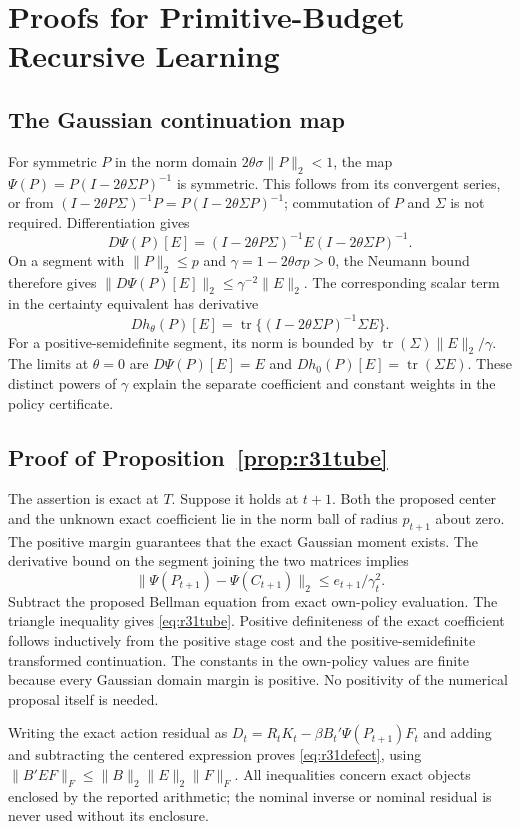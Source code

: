 \section{Proofs for Primitive-Budget Recursive Learning}\label{sec:r31proofs}
\subsection{The Gaussian continuation map}
For symmetric $P$ in the norm domain $2\theta\sigma\|P\|_2<1$, the map
$\Psi(P)=P(I-2\theta\Sigma P)^{-1}$ is symmetric. This follows from its
convergent series, or from
$(I-2\theta P\Sigma)^{-1}P=P(I-2\theta\Sigma P)^{-1}$;
commutation of $P$ and $\Sigma$ is not required. Differentiation gives
\[
 D\Psi(P)[E]=(I-2\theta P\Sigma)^{-1}
               E(I-2\theta\Sigma P)^{-1}.
\]
On a segment with $\|P\|_2\leq p$ and
$\gamma=1-2\theta\sigma p>0$, the Neumann bound therefore gives
$\|D\Psi(P)[E]\|_2\leq\gamma^{-2}\|E\|_2$.
The corresponding scalar term in the certainty equivalent has derivative
\[
 Dh_\theta(P)[E]=\operatorname{tr}
       \{(I-2\theta\Sigma P)^{-1}\Sigma E\}.
\]
For a positive-semidefinite segment, its norm is bounded by
$\operatorname{tr}(\Sigma)\|E\|_2/\gamma$. The limits at $\theta=0$ are
$D\Psi(P)[E]=E$ and $Dh_0(P)[E]=\operatorname{tr}(\Sigma E)$.
These distinct powers of $\gamma$ explain the separate coefficient and
constant weights in the policy certificate.

\subsection{Proof of Proposition~\ref{prop:r31tube}}
The assertion is exact at $T$. Suppose it holds at $t+1$. Both the proposed
center and the unknown exact coefficient lie in the norm ball of radius
$p_{t+1}$ about zero. The positive margin guarantees that the exact Gaussian
moment exists. The derivative bound on the segment joining the two matrices
implies
\[
 \|\Psi(P_{t+1})-\Psi(C_{t+1})\|_2
                         \leq e_{t+1}/\gamma_t^2.
\]
Subtract the proposed Bellman equation from exact own-policy evaluation.
The triangle inequality gives \eqref{eq:r31tube}. Positive definiteness of
the exact coefficient follows inductively from the positive stage cost and
the positive-semidefinite transformed continuation. The constants in the
own-policy values are finite because every Gaussian domain margin is
positive. No positivity of the numerical proposal itself is needed.

Writing the exact action residual as
$D_t=R_tK_t-\beta B_t'\Psi(P_{t+1})F_t$ and adding and subtracting the
centered expression proves \eqref{eq:r31defect}, using
$\|B'EF\|_F\leq\|B\|_2\|E\|_2\|F\|_F$.
All inequalities concern exact objects enclosed by the reported arithmetic;
the nominal inverse or nominal residual is never used without its enclosure.

